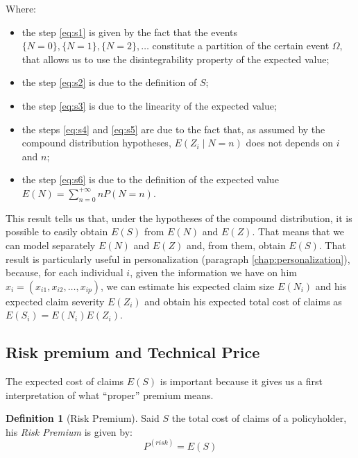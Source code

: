 \documentclass[a4paper, nobind]{templates/ociamthesis}
\providecommand{\tightlist}{%
  \setlength{\itemsep}{0pt}\setlength{\parskip}{0pt}}
\theoremstyle{definition}
\newtheorem{definition}{Definition}[chapter]
\theoremstyle{definition}
\theoremstyle{definition}
\theoremstyle{remark}
\begin{document}
Where:

\begin{itemize}
\tightlist
\item
  the step \eqref{eq:s1} is given by the fact that the events \(\{N=0\}, \{N=1\}, \{N=2\}, \dots\) constitute a partition of the certain event \(\Omega\), that allows us to use the disintegrability property of the expected value;
\item
  the step \eqref{eq:s2} is due to the definition of \(S\);
\item
  the step \eqref{eq:s3} is due to the linearity of the expected value;
\item
  the steps \eqref{eq:s4} and \eqref{eq:s5} are due to the fact that, as assumed by the compound distribution hypotheses, \(E\left( Z_i \middle| N = n \right)\) does not depends on \(i\) and \(n\);
\item
  the step \eqref{eq:s6} is due to the definition of the expected value \(E(N)=\sum_{n=0}^{+\infty}{n P(N=n)}\).
\end{itemize}

This result tells us that, under the hypotheses of the compound distribution, it is possible to easily obtain \(E(S)\) from \(E(N)\) and \(E(Z)\). That means that we can model separately \(E(N)\) and \(E(Z)\) and, from them, obtain \(E(S)\). That result is particularly useful in personalization (paragraph \ref{chap:personalization}), because, for each individual \(i\), given the information we have on him \(x_i=(x_{i1}, x_{i2}, \dots, x_{ip})\), we can estimate his expected claim size \(E(N_i)\) and his expected claim severity \(E(Z_i)\) and obtain his expected total cost of claims as \(E(S_i) = E(N_i) E(Z_i)\).

\hypertarget{risk-premium-and-technical-price}{%
\subsection{Risk premium and Technical Price}\label{risk-premium-and-technical-price}}

The expected cost of claims \(E(S)\) is important because it gives us a first interpretation of what ``proper'' premium means.

\begin{definition}[Risk Premium]
\label{def:risk-premium} \iffalse (Risk Premium) \fi{} Said \(S\) the total cost of claims of a policyholder, his \emph{Risk Premium} is given by:
\[
P^{(risk)} = E(S)
\]
\end{definition}
\end{document}
